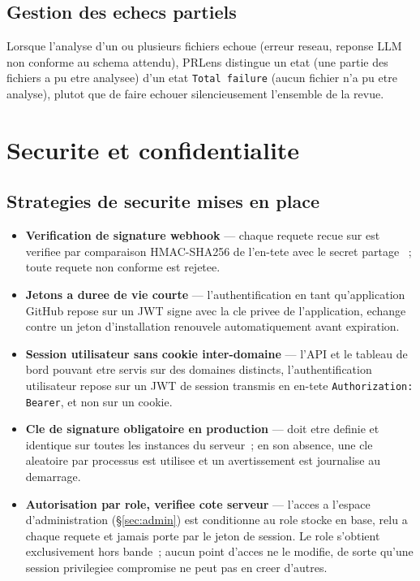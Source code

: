\documentclass[a4paper,12pt,oneside]{report}
\begin{document}
\subsection{Gestion des echecs partiels}

Lorsque l'analyse d'un ou plusieurs fichiers echoue (erreur reseau, reponse LLM non conforme au schema attendu), PRLens distingue un etat  (une partie des fichiers a pu etre analysee) d'un etat \texttt{Total failure} (aucun fichier n'a pu etre analyse), plutot que de faire echouer silencieusement l'ensemble de la revue.

\section{Securite et confidentialite}

\subsection{Strategies de securite mises en place}

\begin{itemize}
  \item \textbf{Verification de signature webhook} --- chaque requete recue sur  est verifiee par comparaison HMAC-SHA256 de l'en-tete  avec le secret partage ~; toute requete non conforme est rejetee.
  \item \textbf{Jetons a duree de vie courte} --- l'authentification en tant qu'application GitHub repose sur un JWT signe avec la cle privee de l'application, echange contre un jeton d'installation renouvele automatiquement avant expiration.
  \item \textbf{Session utilisateur sans cookie inter-domaine} --- l'API et le tableau de bord pouvant etre servis sur des domaines distincts, l'authentification utilisateur repose sur un JWT de session transmis en en-tete \texttt{Authorization: Bearer}, et non sur un cookie.
  \item \textbf{Cle de signature obligatoire en production} ---  doit etre definie et identique sur toutes les instances du serveur~; en son absence, une cle aleatoire par processus est utilisee et un avertissement est journalise au demarrage.
  \item \textbf{Autorisation par role, verifiee cote serveur} --- l'acces a l'espace d'administration (\S\ref{sec:admin}) est conditionne au role stocke en base, relu a chaque requete et jamais porte par le jeton de session. Le role s'obtient exclusivement hors bande~; aucun point d'acces ne le modifie, de sorte qu'une session privilegiee compromise ne peut pas en creer d'autres.
\end{itemize}
\end{document}
